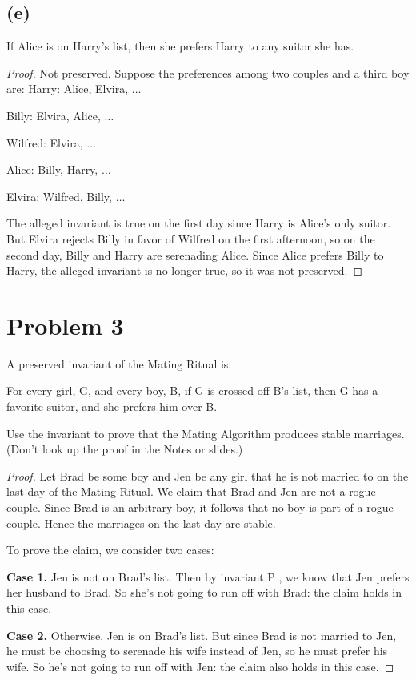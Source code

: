 \documentclass[14pt]{extarticle}
\begin{document}
\subsection{(e)}
If Alice is on Harry’s list, then she prefers Harry to any suitor she has.
\begin{proof}
Not preserved. Suppose the preferences among two couples and a third boy are:
Harry: Alice, Elvira, $\ldots$

Billy: Elvira, Alice, $\ldots$

Wilfred: Elvira, $\ldots$

Alice: Billy, Harry, $\ldots$

Elvira: Wilfred, Billy, $\ldots$

The alleged invariant is true on the first day since Harry is Alice’s only suitor. But Elvira rejects Billy in favor of Wilfred on the first afternoon, so on the second day, Billy and Harry are serenading Alice. Since Alice prefers Billy to Harry, the alleged invariant is no longer true, so it was not preserved.
\end{proof}

\section{Problem 3}
A preserved invariant of the Mating Ritual is:

For every girl, G, and every boy, B, if G is crossed off B’s list, then G has a favorite suitor, and she prefers him over B.

Use the invariant to prove that the Mating Algorithm produces stable marriages. (Don’t look up the proof in the Notes or slides.)
\begin{proof}
Let Brad be some boy and Jen be any girl that he is not married to on the last day of the Mating Ritual. We claim that Brad and Jen are not a rogue couple. Since Brad is an arbitrary boy, it follows that no boy is part of a rogue couple. Hence the marriages on the last day are stable.

To prove the claim, we consider two cases:

{\bf Case 1.} Jen is not on Brad’s list. Then by invariant P , we know that Jen prefers her husband to Brad. So she’s not going to run off with Brad: the claim holds in this case.

{\bf Case 2.} Otherwise, Jen is on Brad’s list. But since Brad is not married to Jen, he must be choosing to serenade his wife instead of Jen, so he must prefer his wife. So he’s not going to run off with Jen: the claim also holds in this case.
\end{proof}
\end{document}
